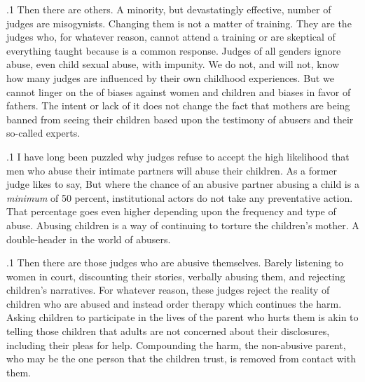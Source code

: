 \documentclass[11pt, twoside]{article}
\begin{document}
{\p.1{%
Then there are others. A minority, but devastatingly effective, number
of judges are misogynists. Changing them is not a matter of training.
They are the judges who, for whatever reason, cannot attend a training or
are skeptical of everything taught because   is a common response. Judges of all genders ignore abuse,
even child sexual abuse, with impunity. We do not, and will not, know
how many judges are influenced by their own childhood experiences.
But we cannot linger on the  of biases against women and children
and biases in favor of fathers. The intent or lack of it does not change
the fact that mothers are being banned from seeing their children based
upon the testimony of abusers and their so-called experts.
} %

\p.1{%
I have long been puzzled why judges refuse to accept the high likelihood that men who abuse their intimate partners will abuse their
children. As a former judge likes to say,  But
where the chance of an abusive partner abusing a child is a \textit{minimum} of
50 percent, institutional actors do not take any preventative action. That
percentage goes even higher depending upon the frequency and type of
abuse. Abusing children is a way of continuing to torture the children's
mother. A double-header in the world of abusers.
} %

\p.1{%
Then there are those judges who are abusive themselves. Barely listening to women in court, discounting their stories, verbally abusing
them, and rejecting children's narratives. For whatever reason, these
judges reject the reality of children who are abused and instead order
 therapy which continues the harm. Asking children to
participate in the lives of the parent who hurts them is akin to telling
those children that adults are not concerned about their disclosures, including their pleas for help. Compounding the harm, the non-abusive
parent, who may be the one person that the children trust, is removed
from contact with them.
} %

}
\end{document}
